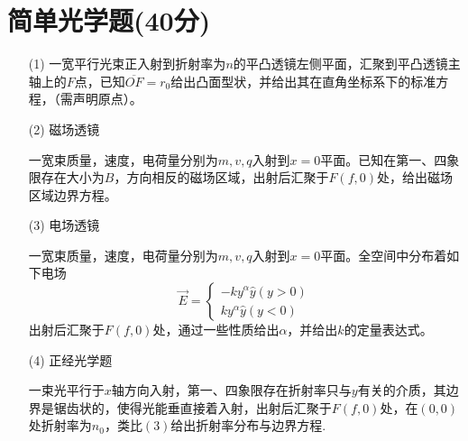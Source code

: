 \documentclass{article}
\begin{document}
\section*{简单光学题(40分)}
\begin{itemize}
\item[(1)]一宽平行光束正入射到折射率为$n$的平凸透镜左侧平面，汇聚到平凸透镜主轴上的$F$点，已知$\overline{OF}=r_0$给出凸面型状，并给出其在直角坐标系下的标准方程，（需声明原点）。
\item[(2)]磁场透镜\par
一宽束质量，速度，电荷量分别为$m,v,q$入射到$x=0$平面。已知在第一、四象限存在大小为$B$，方向相反的磁场区域，出射后汇聚于$F(f,0)$处，给出磁场区域边界方程。
\item[(3)]电场透镜\par
一宽束质量，速度，电荷量分别为$m,v,q$入射到$x=0$平面。全空间中分布着如下电场
\[
\vec{E}=
\begin{cases}
-ky^{\alpha}\hat{y}(y>0)\\
ky^{\alpha}\hat{y}(y<0)
\end{cases}
\]
出射后汇聚于$F(f,0)$处，通过一些性质给出$\alpha$，并给出$k$的定量表达式。
\item[(4)]正经光学题\par
一束光平行于$x$轴方向入射，第一、四象限存在折射率只与$y$有关的介质，其边界是锯齿状的，使得光能垂直接着入射，出射后汇聚于$F(f,0)$处，在$(0,0)$处折射率为$n_0$，类比$(3)$给出折射率分布与边界方程.
\end{itemize}
\end{document}
